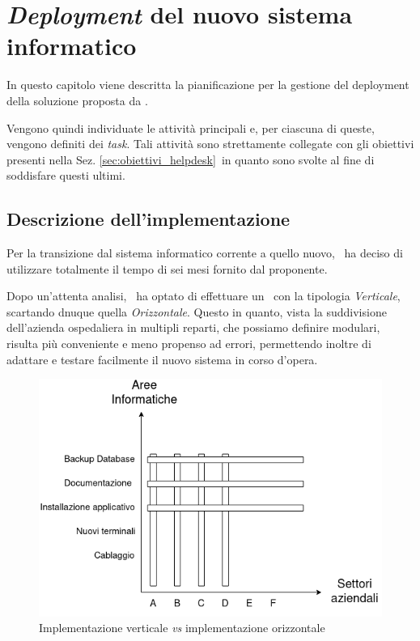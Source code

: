 \chapter{\textit{Deployment} del nuovo sistema informatico}\label{ch:implementazione}


In questo capitolo viene descritta la pianificazione per la gestione del deployment della soluzione proposta da \azienda.


Vengono quindi individuate le attività principali e, per ciascuna di queste, vengono definiti dei \textit{task}.
Tali attività sono strettamente collegate con gli obiettivi presenti nella Sez. \ref{sec:obiettivi_helpdesk}~in quanto sono svolte al fine di soddisfare questi ultimi.

\section{Descrizione dell’implementazione}\label{sec:desc_implementazione}

	Per la transizione dal sistema informatico corrente a quello nuovo, \azienda~ha deciso di utilizzare totalmente il tempo di sei mesi fornito dal proponente.
	
	Dopo un'attenta analisi, \azienda~ha optato di effettuare un \rollout~con la tipologia \textit{Verticale}, scartando dnuque quella \textit{Orizzontale}.
	Questo in quanto, vista la suddivisione dell'azienda ospedaliera in multipli reparti, che possiamo definire modulari, risulta più conveniente e meno propenso ad errori, permettendo inoltre di adattare e testare facilmente il nuovo sistema in corso d'opera.
	
	\begin{figure}[h!]
		\centering
		\includegraphics[width=\linewidth]{img/implementazione.png}
		\caption{Implementazione verticale \textit{vs} implementazione orizzontale}
		\label{fig:implementazione}
	\end{figure}

